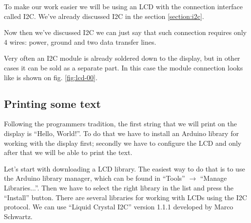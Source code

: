 \documentclass[../sparc.tex]{subfiles}
\begin{document}
To make our work easier we will be using an LCD with the connection interface
called \gls{I2C}. We've already discussed I2C in the section \ref{section:i2c}.

Now then we've discussed I2C we can just say that such connection requires only
4 wires: power, ground and two data transfer lines.

Very often an I2C module is already soldered down to the display, but in other
cases it can be sold as a separate part. In this case the module connection
looks like is shown on fig. \ref{fig:lcd-00}.



\subsection{Printing some text}


Following the programmers tradition, the first string that we will print on the
display is ``Hello, World!''.  To do that we have to install an Arduino library
for working with the display first; secondly we have to configure the LCD and
only after that we will be able to print the text.

Let's start with downloading a LCD library.  The easiest way to do that is to
use the Arduino library manager, which can be found in ``Tools'' $\rightarrow$ ``Manage
Libraries...''.  Then we have to select the right library in the list and press
the ``Install'' button.  There are several libraries for working with LCDs using
the \gls{I2C} protocol.  We can use ``Liquid Crystal I2C'' version 1.1.1
developed by Marco Schwartz.
\end{document}
